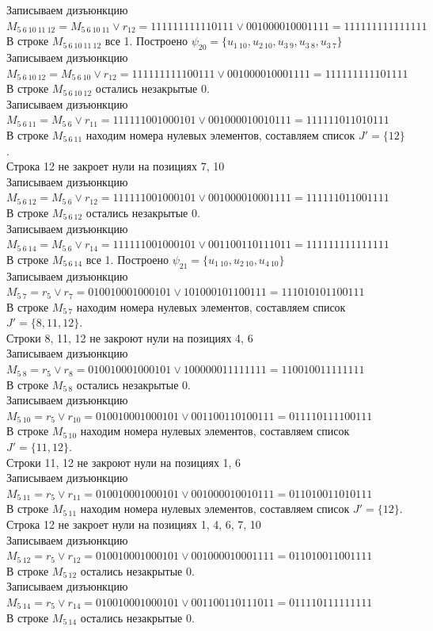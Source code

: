 \documentclass[a4paper,12pt]{article}
\begin{document}
Записываем дизъюнкцию $M_{5\ 6\ 10\ 11\ 12} = M_{5\ 6\ 10\ 11}\lor r_{12} = 111111111110111 \lor 001000010001111 = 111111111111111$\\
В строке $M_{5\ 6\ 10\ 11\ 12}$ все 1. Построено $\psi_{20} = \{u_{1\ 10},u_{2\ 10},u_{3\ 9},u_{3\ 8},u_{3\ 7}\}$\\
Записываем дизъюнкцию $M_{5\ 6\ 10\ 12} = M_{5\ 6\ 10}\lor r_{12} = 111111111100111 \lor 001000010001111 = 111111111101111$\\
В строке $M_{5\ 6\ 10\ 12}$ остались незакрытые 0.\\
Записываем дизъюнкцию $M_{5\ 6\ 11} = M_{5\ 6}\lor r_{11} = 111111001000101 \lor 001000010010111 = 111111011010111$\\
В строке $M_{5\ 6\ 11}$ находим номера нулевых элементов, составляем список $J' = \{12\}$.\\
Строка 12 не закроет нули на позициях 7, 10\\
Записываем дизъюнкцию $M_{5\ 6\ 12} = M_{5\ 6}\lor r_{12} = 111111001000101 \lor 001000010001111 = 111111011001111$\\
В строке $M_{5\ 6\ 12}$ остались незакрытые 0.\\
Записываем дизъюнкцию $M_{5\ 6\ 14} = M_{5\ 6}\lor r_{14} = 111111001000101 \lor 001100110111011 = 111111111111111$\\
В строке $M_{5\ 6\ 14}$ все 1. Построено $\psi_{21} = \{u_{1\ 10},u_{2\ 10},u_{4\ 10}\}$\\
Записываем дизъюнкцию $M_{5\ 7} = r_{5}\lor r_{7} = 010010001000101 \lor 101000101100111 = 111010101100111$\\
В строке $M_{5\ 7}$ находим номера нулевых элементов, составляем список $J' = \{8, 11, 12\}$.\\
Строки 8, 11, 12 не закроют нули на позициях 4, 6\\
Записываем дизъюнкцию $M_{5\ 8} = r_{5}\lor r_{8} = 010010001000101 \lor 100000011111111 = 110010011111111$\\
В строке $M_{5\ 8}$ остались незакрытые 0.\\
Записываем дизъюнкцию $M_{5\ 10} = r_{5}\lor r_{10} = 010010001000101 \lor 001100110100111 = 011110111100111$\\
В строке $M_{5\ 10}$ находим номера нулевых элементов, составляем список $J' = \{11, 12\}$.\\
Строки 11, 12 не закроют нули на позициях 1, 6\\
Записываем дизъюнкцию $M_{5\ 11} = r_{5}\lor r_{11} = 010010001000101 \lor 001000010010111 = 011010011010111$\\
В строке $M_{5\ 11}$ находим номера нулевых элементов, составляем список $J' = \{12\}$.\\
Строка 12 не закроет нули на позициях 1, 4, 6, 7, 10\\
Записываем дизъюнкцию $M_{5\ 12} = r_{5}\lor r_{12} = 010010001000101 \lor 001000010001111 = 011010011001111$\\
В строке $M_{5\ 12}$ остались незакрытые 0.\\
Записываем дизъюнкцию $M_{5\ 14} = r_{5}\lor r_{14} = 010010001000101 \lor 001100110111011 = 011110111111111$\\
В строке $M_{5\ 14}$ остались незакрытые 0.\\
\end{document}
